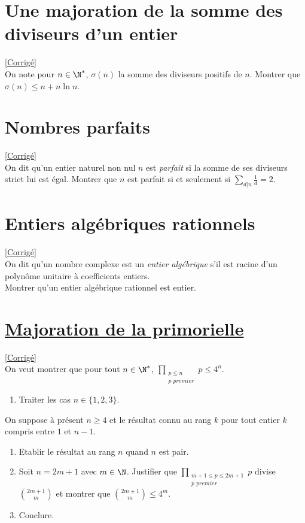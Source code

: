 \documentclass[8pt]{book}
\begin{document}
\section{Une majoration de la somme des diviseurs d'un entier }
\label{Une majoration de la somme des diviseurs d'un entier}
\textcolor{blue}{\hyperref[Une majoration de la somme des diviseurs d'un entier corrigé]{[Corrigé]}}\\
On note pour $n\in \N^*$, $\sigma(n)$ la somme des diviseurs positifs de $n$. Montrer que $\sigma(n)\leq n+n\ln n$.

\section{Nombres parfaits}
\label{Nombres parfaits}
\textcolor{blue}{\hyperref[Nombres parfaits corrigé]{[Corrigé]}}\\
On dit qu'un entier naturel non nul $n$ est \textit{parfait} si la somme de ses diviseurs strict lui est égal. Montrer que $n$ est parfait si et seulement si $\displaystyle\sum_{d|n}\frac{1}{d}=2$.

\section{Entiers algébriques rationnels}
\label{Entiers algébriques rationnels}
\textcolor{blue}{\hyperref[Entiers algébriques rationnels corrigé]{[Corrigé]}}\\
On dit qu'un nombre complexe est un \textit{entier algébrique} s'il est racine d'un polynôme unitaire à coefficients entiers.\\
Montrer qu'un entier algébrique rationnel est entier.

\section{\underline{Majoration de la primorielle} }
\label{Majoration de la primorielle}
\label{Produit des nombres premiers inférieur à un entier donné}
\textcolor{blue}{\hyperref[Majoration de la primorielle corrigé]{[Corrigé]}}\\
On veut montrer que pour tout $n\in\N^*$, $\displaystyle\prod_{\substack{p\leq n\\p \textit{ premier}}}p\leq4^n$.
\begin{enumerate}
	\item Traiter les cas $n\in\{1,2,3\}$.
\end{enumerate}
On suppose à présent $n\geq 4$ et le résultat connu au rang $k$ pour tout entier $k$ compris entre $1$ et $n-1$.
\begin{enumerate}[resume]
	\item Etablir le résultat au rang $n$ quand $n$ est pair.
	\item Soit $n=2m+1$ avec $m\in\N$. Justifier que $\displaystyle\prod_{\substack{m+1\leq p\leq2m+1\\p \textit{ premier}}}p$ divise $\displaystyle\binom{2m+1}{m}$ et montrer que $\displaystyle\binom{2m+1}{m}\leq4^m$.
	\item Conclure.
\end{enumerate}
\end{document}
